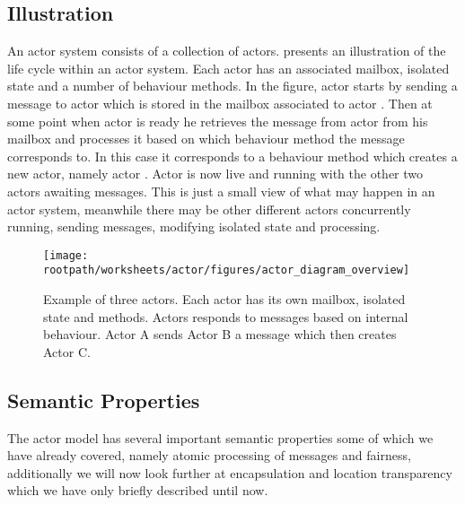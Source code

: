 \subsection{Illustration}
An actor system consists of a collection of actors.  presents an illustration of the life cycle within an actor system. Each actor has an associated mailbox, isolated state and a number of behaviour methods. In the figure, actor  starts by sending a message to actor  which is stored in the mailbox associated to actor . Then at some point when actor  is ready he retrieves the message from actor  from his mailbox and processes it based on which behaviour method the message corresponds to. In this case it corresponds to a behaviour method which creates a new actor, namely actor . Actor  is now live and running with the other two actors awaiting messages. This is just a small view of what may happen in an actor system, meanwhile there may be other different actors concurrently running, sending messages, modifying isolated state and processing.

\begin{figure}[h!]
\centering
\texttt{[image: \\rootpath/worksheets/actor/figures/actor\_diagram\_overview]}
\caption{Example of three actors. Each actor has its own mailbox, isolated state and methods. Actors responds to messages based on internal behaviour. Actor A sends Actor B a message which then creates Actor C.}\label{fig:actor_overview}
\end{figure}

\subsection{Semantic Properties}
The actor model has several important semantic properties some of which we have already covered, namely atomic processing of messages and fairness, additionally we will now look further at encapsulation and location transparency which we have only briefly described until now\cite{karmani2011actors}.

